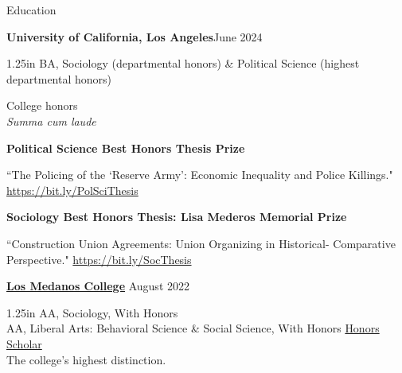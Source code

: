 \documentclass[
	12pt, %
]{resume} %
\newcommand{\righthandindent}{1.25in}
\begin{document}
\begin{rSection}{Education}

\textbf{University of California, Los Angeles}\hfill June 2024
\vspace{-6pt}
\begin{adjustwidth}{20pt}{\righthandindent}
BA, Sociology (departmental honors) \& Political Science (highest departmental honors)

College honors\\
\textit{Summa cum laude}

\textbf{Political Science Best Honors Thesis Prize}
\begin{adjustwidth}{0pt}{0pt}
\vspace{-6pt}
``The Policing of the `Reserve Army': Economic Inequality and Police 
\hspace*{0.5in}Killings." \href{https://bit.ly/PolSciThesis}{https://bit.ly/PolSciThesis}
\end{adjustwidth}

\textbf{Sociology Best Honors Thesis: Lisa Mederos Memorial Prize}
\begin{adjustwidth}{0pt}{0pt}
\vspace{-6pt}
``Construction Union Agreements: Union Organizing in Historical-
\hspace*{0.5in}Comparative Perspective." \href{https://bit.ly/SocThesis}{https://bit.ly/SocThesis}
\end{adjustwidth}

\end{adjustwidth}

    \textbf{\href{https://www.losmedanos.edu/}{Los Medanos College}} \hfill August 2022 
\begin{adjustwidth}{20pt}{\righthandindent}
    \vspace{-6pt}
    AA, Sociology, With Honors\\
    AA, Liberal Arts: Behavioral Science \& Social Science, With Honors
\href{https://www.losmedanos.edu/honors/prog.aspx\#:~:text=Honors\%20Scholar\%20Requirements}{Honors Scholar}\\
\hspace*{20pt}The college’s highest distinction.


\end{adjustwidth}
\end{rSection}
\end{document}
